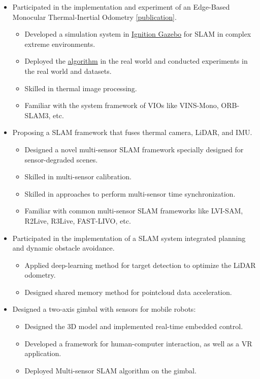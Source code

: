 \documentclass[11pt,a4paper]{moderncv}        %
\begin{document}
%
{
\begin{itemize}%
\item Participated in the implementation and experiment of an Edge-Based Monocular Thermal-Inertial Odometry \hyperref[sec:Publications]{[publication]}.
\begin{itemize}%
\hypersetup{urlcolor=black}
\item Developed a simulation system in \href{https://gazebosim.org/api/gazebo/2.10/index.html}{Ignition Gazebo} for SLAM in complex extreme environments.
\item Deployed the \hyperref[sec:Publications]{algorithm} in the real world and conducted experiments in the real world and datasets.
\item Skilled in thermal image processing.
\item Familiar with the system framework of VIOs like VINS-Mono, ORB-SLAM3, etc.
\end{itemize}
\item Proposing a SLAM framework that fuses thermal camera, LiDAR, and IMU.
\begin{itemize}%
\item Designed a novel multi-sensor SLAM framework specially designed for sensor-degraded scenes. 
\item Skilled in multi-sensor calibration.
\item Skilled in approaches to perform multi-sensor time synchronization.
\item Familiar with common multi-sensor SLAM frameworks like LVI-SAM, R2Live, R3Live, FAST-LIVO, etc.
\end{itemize}
\item Participated in the implementation of a SLAM system integrated planning and dynamic obstacle avoidance.
\begin{itemize}%
\item Applied deep-learning method for target detection to optimize the LiDAR odometry.
\item Designed shared memory method for pointcloud data acceleration.
\end{itemize}
\end{itemize}
}

%
{
\begin{itemize}%
\item Designed a two-axis gimbal with sensors for mobile robots:
\begin{itemize}%
\item Designed the 3D model and implemented real-time embedded control.
\item Developed a framework for human-computer interaction, as well as a VR application.
\item Deployed Multi-sensor SLAM algorithm on the gimbal.  
\end{itemize}
\end{itemize}
}
\end{document}
